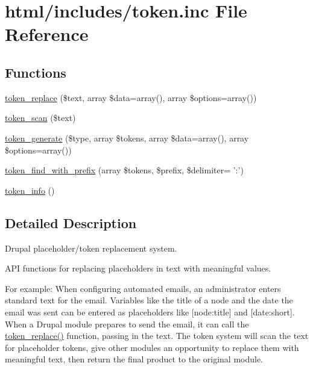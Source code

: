 \hypertarget{includes_2token_8inc}{
\section{html/includes/token.inc File Reference}
\label{includes_2token_8inc}
}
\subsection*{Functions}
\begin{DoxyCompactItemize}
\item 
\hyperlink{includes_2token_8inc_a47eb294b05ca8d04439a9a82ccc4d82a}{token\_\-replace} (\$text, array \$data=array(), array \$options=array())
\item 
\hyperlink{includes_2token_8inc_a0672a1031161b81dd5aff4476bbc1c99}{token\_\-scan} (\$text)
\item 
\hyperlink{includes_2token_8inc_abcd5ba5a75b47fe97338243a62d4eecd}{token\_\-generate} (\$type, array \$tokens, array \$data=array(), array \$options=array())
\item 
\hyperlink{includes_2token_8inc_ae6241ad02cf636533b0a8304d2df4c1b}{token\_\-find\_\-with\_\-prefix} (array \$tokens, \$prefix, \$delimiter= ':')
\item 
\hyperlink{includes_2token_8inc_a24f0543f20ed0c8b807a680e67248704}{token\_\-info} ()
\end{DoxyCompactItemize}


\subsection{Detailed Description}
Drupal placeholder/token replacement system.

API functions for replacing placeholders in text with meaningful values.

For example: When configuring automated emails, an administrator enters standard text for the email. Variables like the title of a node and the date the email was sent can be entered as placeholders like \mbox{[}node:title\mbox{]} and \mbox{[}date:short\mbox{]}. When a Drupal module prepares to send the email, it can call the \hyperlink{includes_2token_8inc_a47eb294b05ca8d04439a9a82ccc4d82a}{token\_\-replace()} function, passing in the text. The token system will scan the text for placeholder tokens, give other modules an opportunity to replace them with meaningful text, then return the final product to the original module.

